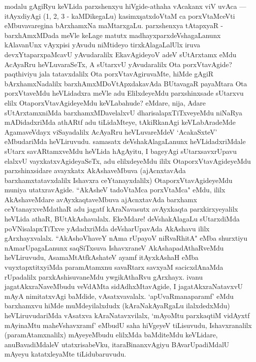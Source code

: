 \begin{artha}
modalu gAgiRyu keVLida parxshenxyu hiVgide-athaha vAcakanx viV uvAca --- itAyxdiyAgi (1, 2, 3 - kaMDikegaLu) kasimx\c satxdoVtaM ca porxVtaMceVti eMbuvavaregina bArxhamxNa maMtarxgaLu. parxshenxya tAtapxyaR - barxhAmxMDada meVle \-keLage matutx madhayxparxdeVshagaLanunx kAlavanUnx vAyxpisi yAvudu niMtideyo tirxkAla\-gaLalUlx iruva devxYtaparxpaMcavU yAvudaralilx EkavAgideyoV adeV sUtArxtamx eMdu AcAyaRru heVLuvaraSeTx, A sUtarxvU yAvudaralilx Ota porxVtavAgide? paqthiviyu	jala tatavxdalilx Ota porxVtavAgiruvaMte, hiMde gAgiR bArxhamxNadalilx \-barxhAmxMDoVtApxdakavAda BUtavagaR payaMtara Ota porxVtaveMdu heVLidadxra meVle adu ElilxdeyeMdu parxshinxsade sUtarxvu elilx OtaporxVtavAgideyeMdu keVLabahude? eMdare, nija, Adare sUtArxtamxniMda barxhamxMDavelalxvU dharisalapxTiTxveyeMdu niNaRya mADidadxriMda athARtf adu tiLidaMteye, tAkiRkanAgi keVLabAradeMde Agama\-veVdayx viSayadalilx AcAyaRru heVLuvareMdeV `AcakaSxteV' eMbudariMda heVLi\-ruvudu. samasatx deVshakAlagaLanunx heVLidadxriMdale sUtarx savARtamxveMdu heVLida hAgAyitu, I bageyAgi sUtarxsavxrUpavu elalxvU vayxkatxvAgideyaSeTx, adu elilxdeyeMdu ililx OtaporxVtavAgideyeMdu parxshinxsidare avayxkatx AkAshaveMbuva (ajAcnxtavAda barxhamxtatavxdalilx Ishavxra ceYtanayxdalilx) OtaporxVtavAgideyeMdu muniya utatxravAgide. ``AkAsheV tadoVtaMca porxVtaMca" eMdu, ililx AkAshaveMdare avAyxkaqtaveMbuva ajAcnxtavAda barxhamx ceYtanayxveMdathaR adu jagatf kAraNavasutx avAyxkaqta parxkirxyeyalilx heVLida athaR, BUtAkAshavalalx. EkeMdare! deVshakAlagaLu sUtarxdiMda poVNisalapxTiTxve yAdadxriMda deVsharUpavAda AkAshavu ililx gArxhayxvalalx. ``AkAshoVhaveY nAma rUpayoV niRvaRhitA" eMba shurxtiyu nAmarUpagaLanunx saqSiTxsuva IshavxraneV AkAshapadAthaRveMdu heVLiruvudu, AsamaMtAtfkAshateV ayamf itAyxkAshaH eMba vuyxtapxtitxyiMda paramAtamxnu savaRtarx savxyaM sacicxdAnaMda rUpadalilx parxkAshisuvaneMdu ywgikAthaRvu gArxhayx. ivanu jagatAkxraNaveMbudu veVdAMta sidAdhxMtavAgide, I jagatAkxraNatavxvU mAyA nimitatxvAgi baMdide, vAsatxvavalalx. `apUvaRmanaparamf' eMdu barxhamxvu hiMde muMdeyilalxdudx (kAraNakAyaRgaLu ilalxdedxMdu) heVLiruvudariMda vAsatxva kAraNatavxvilalx, `mAyoMtu parxkaqtiM vidAyxtf mAyinaMtu maheVshavxramf' eMbudU saha hiVgeyeV tiLisuvudu, Ishavxranalilx (paramAtamxnalilx) mAyeyeMbudu elilxMda baMditeMdu keVLidare, anuBavadiMdaleV utatxrisabeVku, itaraBinanxvAgiyu BAvarUpadiMdalU mAyeyu katatxleyaMte tiLidubaruvudu. 
\end{artha}%

